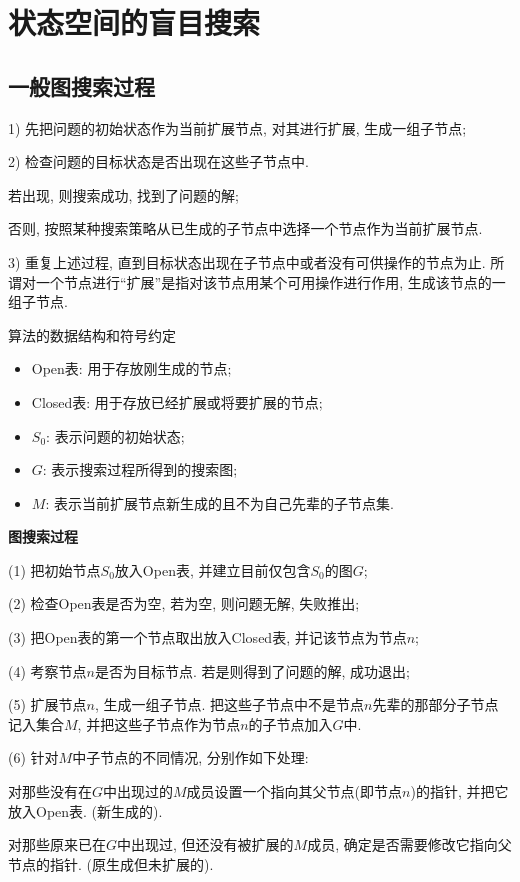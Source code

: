 \section{状态空间的盲目搜索}
\subsection{一般图搜索过程}
1) 先把问题的初始状态作为当前扩展节点, 对其进行扩展, 生成一组子节点;

2) 检查问题的目标状态是否出现在这些子节点中.

\qquad{} 若出现, 则搜索成功, 找到了问题的解;

\qquad{} 否则, 按照某种搜索策略从已生成的子节点中选择一个节点作为当前扩展节点.

3) 重复上述过程, 直到目标状态出现在子节点中或者没有可供操作的节点为止. 所谓对一个节点进行“扩展”是指对该节点用某个可用操作进行作用, 生成该节点的一组子节点.

算法的数据结构和符号约定
\begin{itemize}
\item Open表: 用于存放刚生成的节点;
\item Closed表: 用于存放已经扩展或将要扩展的节点;
\item $S_0$: 表示问题的初始状态;
\item $G$: 表示搜索过程所得到的搜索图;
\item $M$: 表示当前扩展节点新生成的且不为自己先辈的子节点集.
\end{itemize}

\textbf{图搜索过程}

(1) 把初始节点$S_0$放入Open表, 并建立目前仅包含$S_0$的图$G$;

(2) 检查Open表是否为空, 若为空, 则问题无解, 失败推出;

(3) 把Open表的第一个节点取出放入Closed表, 并记该节点为节点$n$;

(4) 考察节点$n$是否为目标节点. 若是则得到了问题的解, 成功退出;

(5) 扩展节点$n$, 生成一组子节点. 把这些子节点中不是节点$n$先辈的那部分子节点记入集合$M$, 并把这些子节点作为节点$n$的子节点加入$G$中.

(6) 针对$M$中子节点的不同情况, 分别作如下处理:

    \quad {} 对那些没有在$G$中出现过的$M$成员设置一个指向其父节点(即节点$n$)的指针, 并把它放入Open表. (新生成的).

    \quad {} 对那些原来已在$G$中出现过, 但还没有被扩展的$M$成员, 确定是否需要修改它指向父节点的指针. (原生成但未扩展的).

